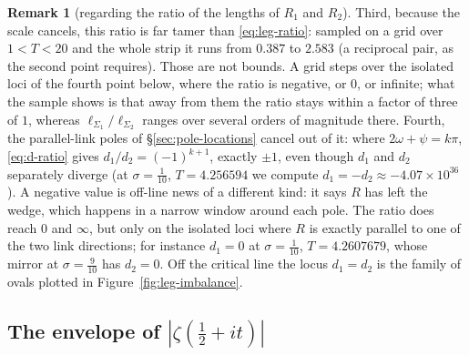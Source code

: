 \documentclass[11pt]{article}
\theoremstyle{definition}
\newtheorem{remark}[theorem]{Remark}
\begin{document}
\begin{remark}[regarding the ratio of the lengths of $R_{1}$ and $R_{2}$]
Third, because the scale cancels, this ratio is far tamer than
\eqref{eq:leg-ratio}: sampled on a grid over $1<T<20$ and the whole strip it
runs from $0.387$ to $2.583$ (a reciprocal pair, as the second point
requires). Those are not bounds. A grid steps over the isolated loci of the
fourth point below, where the ratio is negative, or $0$, or infinite; what the
sample shows is that away from them the ratio stays within a factor of three
of $1$, whereas
$\ell_{\Sigma_1}/\ell_{\Sigma_2}$ ranges over several orders of magnitude
there. Fourth, the parallel-link poles of \S\ref{sec:pole-locations} cancel out
of it: where $2\omega+\psi=k\pi$, \eqref{eq:d-ratio} gives
$d_1/d_2=(-1)^{k+1}$, exactly $\pm1$, even though $d_1$ and $d_2$ separately
diverge (at $\sigma=\tfrac1{10}$, $T=4.256594$ we compute
$d_1=-d_2\approx-4.07\times10^{36}$). A negative value is off-line news of a
different kind: it says $R$ has left the wedge, which happens in a narrow window
around each pole. The ratio does reach $0$ and $\infty$, but only on the
isolated loci where $R$ is exactly parallel to one of the two link directions;
for instance $d_1=0$ at $\sigma=\tfrac1{10}$, $T=4.2607679$, whose mirror at
$\sigma=\tfrac9{10}$ has $d_2=0$. Off the critical line the locus $d_1=d_2$ is
the family of ovals plotted in Figure~\ref{fig:leg-imbalance}.
\end{remark}

\subsection{\texorpdfstring{The envelope of $\left|\zeta\!\left(\tfrac12+it\right)\right|$}{The envelope of |zeta(1/2+it)|}}\label{sec:envelope}
\end{document}
